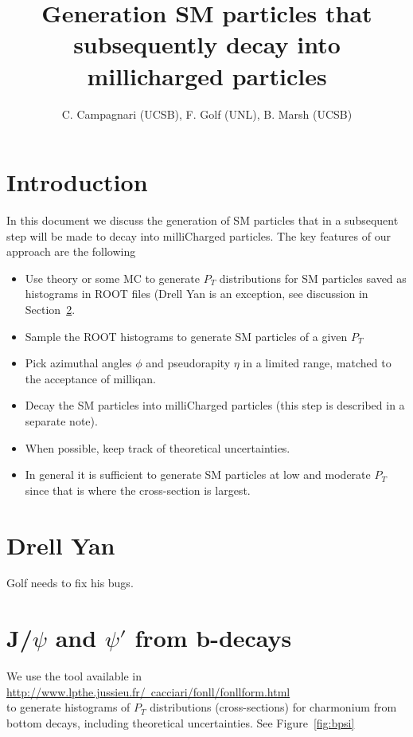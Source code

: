 \documentclass[12pt]{article}
\title{Generation SM particles that subsequently decay into millicharged particles}
\author{C. Campagnari (UCSB), F. Golf (UNL), B. Marsh (UCSB)}
\begin{document}
\maketitle


\section{Introduction}
In this document we discuss the generation of SM particles that in 
a subsequent step will be made to decay into milliCharged particles.
The key features of our approach are the following
\begin{itemize}
\item Use theory or some MC to generate $P_T$ distributions for SM
  particles
saved as histograms in ROOT files (Drell Yan is an exception, see
discussion in Section~\ref{sec:DY}.
\item Sample the ROOT histograms to generate SM particles of a 
given $P_T$
\item Pick azimuthal angles $\phi$ and pseudorapity $\eta$ in a
  limited 
range, matched to the acceptance of milliqan.
\item Decay the SM particles into milliCharged particles (this 
step is described in a separate note).  
\item When possible, keep track of theoretical uncertainties.
\item In general it is sufficient to generate SM particles at low 
and moderate $P_T$ since that is where the cross-section is largest.
\end{itemize}

\section{Drell Yan}
\label{sec:DY}

Golf needs to fix his bugs.

\section{J/$\psi$ and $\psi'$ from b-decays}
\label{sec:bpsi}
We use the tool available in \\
\href{http://www.lpthe.jussieu.fr/~cacciari/fonll/fonllform.html}
{http://www.lpthe.jussieu.fr/~cacciari/fonll/fonllform.html} \\
to
generate histograms of $P_T$ distributions (cross-sections) for charmonium from 
bottom decays, including theoretical 
uncertainties\cite{Cacciari:2012ny,Cacciari:2015fta}.  
See Figure~\ref{fig:bpsi} 
\end{document}
